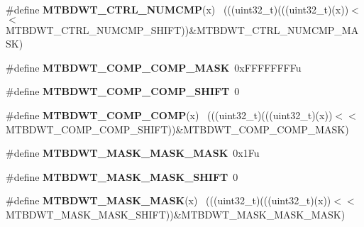 \begin{DoxyCompactItemize}
\item 
\hypertarget{group___m_t_b_d_w_t___register___masks_ga99d11503a347139c3f1b007705f709e8}{}\#define {\bfseries M\+T\+B\+D\+W\+T\+\_\+\+C\+T\+R\+L\+\_\+\+N\+U\+M\+C\+M\+P}(x)                                    ~(((uint32\+\_\+t)(((uint32\+\_\+t)(x))$<$$<$M\+T\+B\+D\+W\+T\+\_\+\+C\+T\+R\+L\+\_\+\+N\+U\+M\+C\+M\+P\+\_\+\+S\+H\+I\+F\+T))\&M\+T\+B\+D\+W\+T\+\_\+\+C\+T\+R\+L\+\_\+\+N\+U\+M\+C\+M\+P\+\_\+\+M\+A\+S\+K)\label{group___m_t_b_d_w_t___register___masks_ga99d11503a347139c3f1b007705f709e8}

\item 
\hypertarget{group___m_t_b_d_w_t___register___masks_ga95b185cf8a19b80b863058a837c0978d}{}\#define {\bfseries M\+T\+B\+D\+W\+T\+\_\+\+C\+O\+M\+P\+\_\+\+C\+O\+M\+P\+\_\+\+M\+A\+S\+K}~0x\+F\+F\+F\+F\+F\+F\+F\+Fu\label{group___m_t_b_d_w_t___register___masks_ga95b185cf8a19b80b863058a837c0978d}

\item 
\hypertarget{group___m_t_b_d_w_t___register___masks_ga0ec26e5cefc95dac603a0b03b1ad0fdd}{}\#define {\bfseries M\+T\+B\+D\+W\+T\+\_\+\+C\+O\+M\+P\+\_\+\+C\+O\+M\+P\+\_\+\+S\+H\+I\+F\+T}~0\label{group___m_t_b_d_w_t___register___masks_ga0ec26e5cefc95dac603a0b03b1ad0fdd}

\item 
\hypertarget{group___m_t_b_d_w_t___register___masks_gaa968fdd5c03e1dc0f7f423140b2d6663}{}\#define {\bfseries M\+T\+B\+D\+W\+T\+\_\+\+C\+O\+M\+P\+\_\+\+C\+O\+M\+P}(x)                                        ~(((uint32\+\_\+t)(((uint32\+\_\+t)(x))$<$$<$M\+T\+B\+D\+W\+T\+\_\+\+C\+O\+M\+P\+\_\+\+C\+O\+M\+P\+\_\+\+S\+H\+I\+F\+T))\&M\+T\+B\+D\+W\+T\+\_\+\+C\+O\+M\+P\+\_\+\+C\+O\+M\+P\+\_\+\+M\+A\+S\+K)\label{group___m_t_b_d_w_t___register___masks_gaa968fdd5c03e1dc0f7f423140b2d6663}

\item 
\hypertarget{group___m_t_b_d_w_t___register___masks_gaa4fcad7c638af9ad4f678c9b02fe083e}{}\#define {\bfseries M\+T\+B\+D\+W\+T\+\_\+\+M\+A\+S\+K\+\_\+\+M\+A\+S\+K\+\_\+\+M\+A\+S\+K}~0x1\+Fu\label{group___m_t_b_d_w_t___register___masks_gaa4fcad7c638af9ad4f678c9b02fe083e}

\item 
\hypertarget{group___m_t_b_d_w_t___register___masks_ga2ebeb9592fd6b0121c2e3729f5afd2ff}{}\#define {\bfseries M\+T\+B\+D\+W\+T\+\_\+\+M\+A\+S\+K\+\_\+\+M\+A\+S\+K\+\_\+\+S\+H\+I\+F\+T}~0\label{group___m_t_b_d_w_t___register___masks_ga2ebeb9592fd6b0121c2e3729f5afd2ff}

\item 
\hypertarget{group___m_t_b_d_w_t___register___masks_ga8cf09f38ab03de9139491e2a4c1666d0}{}\#define {\bfseries M\+T\+B\+D\+W\+T\+\_\+\+M\+A\+S\+K\+\_\+\+M\+A\+S\+K}(x)                                        ~(((uint32\+\_\+t)(((uint32\+\_\+t)(x))$<$$<$M\+T\+B\+D\+W\+T\+\_\+\+M\+A\+S\+K\+\_\+\+M\+A\+S\+K\+\_\+\+S\+H\+I\+F\+T))\&M\+T\+B\+D\+W\+T\+\_\+\+M\+A\+S\+K\+\_\+\+M\+A\+S\+K\+\_\+\+M\+A\+S\+K)\label{group___m_t_b_d_w_t___register___masks_ga8cf09f38ab03de9139491e2a4c1666d0}


\end{DoxyCompactItemize}
